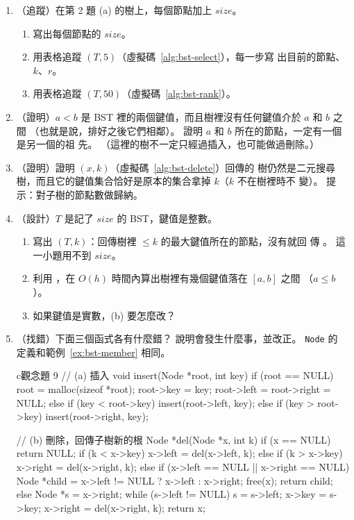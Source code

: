 \begin{enumerate}
\item （追蹤）在第 2 題 (a) 的樹上，每個節點加上 $\mathit{size}$。
\begin{enumerate}
\item 寫出每個節點的 $\mathit{size}$。
\item 用表格追蹤 $(T, 5)$（虛擬碼~\ref{alg:bst-select}），每一步寫
出目前的節點、$k$、$r$。
\item 用表格追蹤 $(T, 50)$（虛擬碼~\ref{alg:bst-rank}）。
\end{enumerate}

\item （證明）$a < b$ 是 BST 裡的兩個鍵值，而且樹裡沒有任何鍵值介於 $a$ 和 $b$ 之間
（也就是說，排好之後它們相鄰）。 證明 $a$ 和 $b$ 所在的節點，一定有一個是另一個的祖
先。 （這裡的樹不一定只經過插入，也可能做過刪除。）

\item （證明）證明 $(x, k)$（虛擬碼~\ref{alg:bst-delete}）回傳的
樹仍然是二元搜尋樹，而且它的鍵值集合恰好是原本的集合拿掉 $k$（$k$ 不在樹裡時不
變）。 提示：對子樹的節點數做歸納。

\item （設計）$T$ 是記了 $\mathit{size}$ 的 BST，鍵值是整數。
\begin{enumerate}
\item 寫出 $(T, k)$：回傳樹裡 $\le k$ 的最大鍵值所在的節點，沒有就回
傳 \NIL。 這一小題用不到 $\mathit{size}$。
\item 利用 ，在 $O(h)$ 時間內算出樹裡有幾個鍵值落在 $[a, b]$ 之間
（$a \le b$）。
\item 如果鍵值是實數，(b) 要怎麼改？
\end{enumerate}

\item （找錯）下面三個函式各有什麼錯？ 說明會發生什麼事，並改正。 \texttt{Node} 的
定義和範例~\ref{ex:bst-member} 相同。
\begin{code}{c}{觀念題 9}
// (a) 插入
void insert(Node *root, int key)
{
    if (root == NULL) {
        root = malloc(sizeof *root);
        root->key = key;
        root->left = root->right = NULL;
    } else if (key < root->key) {
        insert(root->left, key);
    } else if (key > root->key) {
        insert(root->right, key);
    }
}

// (b) 刪除，回傳子樹新的根
Node *del(Node *x, int k)
{
    if (x == NULL)
        return NULL;
    if (k < x->key) {
        x->left = del(x->left, k);
    } else if (k > x->key) {
        x->right = del(x->right, k);
    } else if (x->left == NULL || x->right == NULL) {
        Node *child = x->left != NULL ? x->left : x->right;
        free(x);
        return child;
    } else {
        Node *s = x->right;
        while (s->left != NULL)
            s = s->left;
        x->key = s->key;
        x->right = del(x->right, k);
    }
    return x;
}


\end{code}
\end{enumerate}

